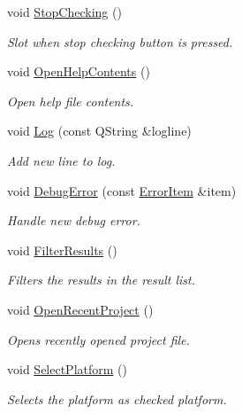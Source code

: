 \begin{DoxyCompactItemize}
void \hyperlink{class_main_window_a61bdc8577d17ce192d3c26491969b696}{Stop\-Checking} ()
\begin{DoxyCompactList}\small\item\em Slot when stop checking button is pressed. \end{DoxyCompactList}\item 
void \hyperlink{class_main_window_aca4de833364c04e55f7f91665ce0419f}{Open\-Help\-Contents} ()
\begin{DoxyCompactList}\small\item\em Open help file contents. \end{DoxyCompactList}\item 
void \hyperlink{class_main_window_a7fa9f77e7f1f31c52fea5f0a1f6925a1}{Log} (const Q\-String \&logline)
\begin{DoxyCompactList}\small\item\em Add new line to log. \end{DoxyCompactList}\item 
void \hyperlink{class_main_window_aa96831c3b89377c6a18b5d5fcf47e26b}{Debug\-Error} (const \hyperlink{class_error_item}{Error\-Item} \&item)
\begin{DoxyCompactList}\small\item\em Handle new debug error. \end{DoxyCompactList}\item 
void \hyperlink{class_main_window_a4d837365e6c9179bd88209d5fa995b3a}{Filter\-Results} ()
\begin{DoxyCompactList}\small\item\em Filters the results in the result list. \end{DoxyCompactList}\item 
void \hyperlink{class_main_window_a35429dc03b779e45d234ffdf81ffb731}{Open\-Recent\-Project} ()
\begin{DoxyCompactList}\small\item\em Opens recently opened project file. \end{DoxyCompactList}\item 
void \hyperlink{class_main_window_adfee537ccbb34d30001954e9332a63b2}{Select\-Platform} ()
\begin{DoxyCompactList}\small\item\em Selects the platform as checked platform. \end{DoxyCompactList}\end{DoxyCompactItemize}
